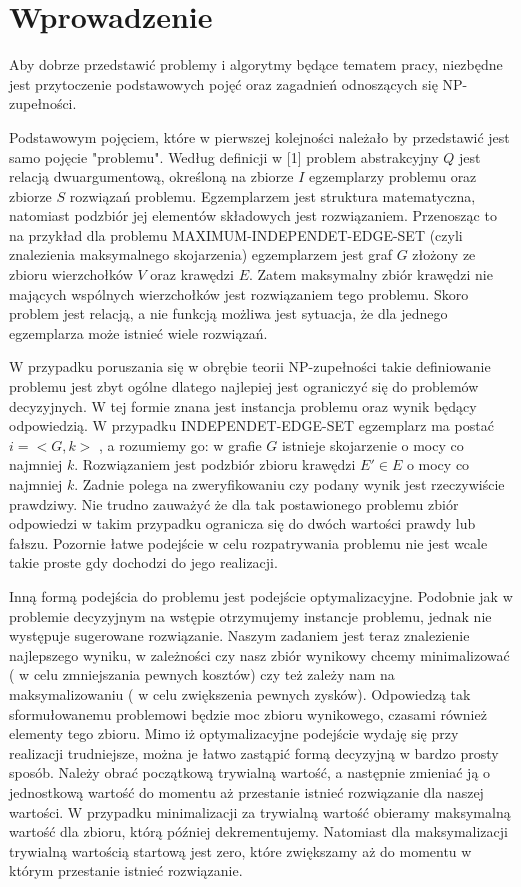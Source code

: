 \chapter{Wprowadzenie}

Aby dobrze przedstawić problemy i algorytmy będące tematem pracy, niezbędne jest przytoczenie podstawowych pojęć oraz zagadnień odnoszących się NP-zupełności.

Podstawowym pojęciem, które w pierwszej kolejności należało by przedstawić jest samo pojęcie "problemu". Według definicji w [1] problem abstrakcyjny $Q$ jest relacją dwuargumentową, określoną na zbiorze $I$ egzemplarzy problemu oraz zbiorze $S$ rozwiązań problemu. Egzemplarzem jest struktura matematyczna, natomiast podzbiór jej elementów składowych jest rozwiązaniem. Przenosząc to na przykład dla problemu MAXIMUM-INDEPENDET-EDGE-SET (czyli znalezienia maksymalnego skojarzenia) egzemplarzem jest graf $G$ złożony ze zbioru wierzchołków $V$ oraz krawędzi $E$. Zatem maksymalny zbiór krawędzi nie mających wspólnych wierzchołków jest rozwiązaniem tego problemu. Skoro problem jest relacją, a nie funkcją możliwa jest sytuacja, że dla jednego egzemplarza może istnieć wiele rozwiązań.

W przypadku poruszania się w obrębie teorii NP-zupełności takie definiowanie problemu jest zbyt ogólne dlatego najlepiej jest ograniczyć się do problemów decyzyjnych. W tej formie znana jest instancja problemu oraz wynik będący odpowiedzią. W przypadku INDEPENDET-EDGE-SET egzemplarz ma postać $i = <G,k>$ , a rozumiemy go: w grafie $G$ istnieje skojarzenie o mocy co najmniej $k$. Rozwiązaniem jest podzbiór zbioru krawędzi $E' \in E$ o mocy co najmniej $k$. Zadnie polega na zweryfikowaniu czy podany wynik jest rzeczywiście prawdziwy. Nie trudno zauważyć że dla tak postawionego problemu zbiór odpowiedzi w takim przypadku ogranicza się do dwóch wartości prawdy lub fałszu. Pozornie łatwe podejście w celu rozpatrywania problemu nie jest wcale takie proste gdy dochodzi do jego realizacji.
	
Inną formą podejścia do problemu jest podejście optymalizacyjne. Podobnie jak w problemie decyzyjnym na wstępie otrzymujemy instancje problemu, jednak nie występuje sugerowane rozwiązanie. Naszym zadaniem jest teraz znalezienie najlepszego wyniku, w zależności czy nasz zbiór wynikowy chcemy minimalizować ( w celu zmniejszania pewnych kosztów) czy też zależy nam na maksymalizowaniu ( w celu zwiększenia pewnych zysków). Odpowiedzą tak sformułowanemu problemowi będzie moc zbioru wynikowego, czasami również elementy tego zbioru. Mimo iż optymalizacyjne podejście wydaję się przy realizacji trudniejsze, można je łatwo zastąpić formą decyzyjną w bardzo prosty sposób. Należy obrać początkową trywialną wartość, a następnie zmieniać ją o jednostkową wartość do momentu aż przestanie istnieć rozwiązanie dla naszej wartości. W przypadku minimalizacji za trywialną wartość obieramy maksymalną wartość dla zbioru, którą później dekrementujemy. Natomiast dla maksymalizacji trywialną wartością startową jest zero, które zwiększamy aż do momentu w którym przestanie istnieć rozwiązanie.

